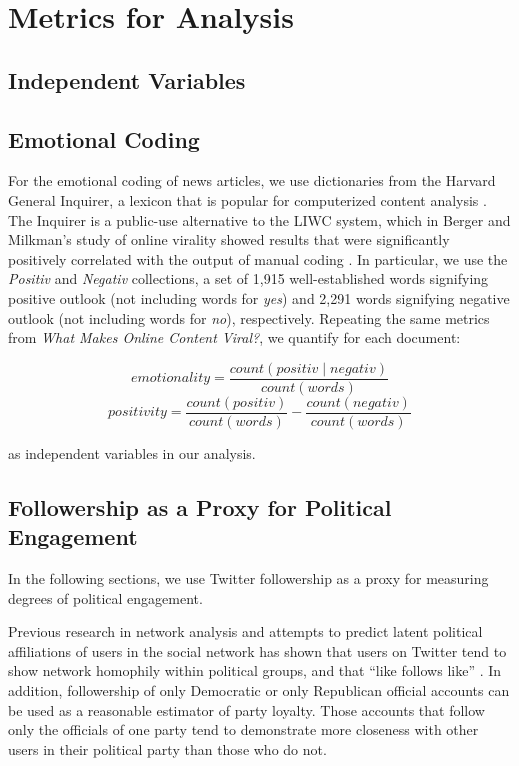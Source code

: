  \chapter{Metrics for Analysis}
\section{Independent Variables}


\section{Emotional Coding}
For the emotional coding of news articles, we use dictionaries from the Harvard General Inquirer, a lexicon that is popular for computerized content analysis \cite{ stone1963computer}. The Inquirer is a public-use alternative to the LIWC system, which in Berger and Milkman’s study of online virality showed results that were significantly positively correlated with the output of manual coding \cite{berger2012makes}. In particular, we use the \emph{Positiv} and \emph{Negativ} collections, a set of 1,915 well-established words signifying positive outlook (not including words for \emph{yes}) and 2,291 words signifying negative outlook (not including words for \emph{no}), respectively. Repeating the same metrics from \emph{What Makes Online Content Viral?}, we quantify for each document:

$$ emotionality = \frac{count(positiv \mid negativ)}{count(words)}$$
$$ positivity = \frac{count(positiv)}{count(words)} - \frac{count(negativ)}{count(words)}$$

as independent variables in our analysis.

 \section{Followership as a Proxy for Political Engagement}
In the following sections, we use Twitter followership as a proxy for measuring degrees of political engagement. 

Previous research in network analysis and attempts to predict latent political affiliations of users in the social network has shown that users on Twitter tend to show network homophily within political groups, and that ``like follows like'' \cite{colleoni2014echo}. In addition, followership of only Democratic or only Republican official accounts can be used as a reasonable estimator of party loyalty. Those accounts that follow only the officials of one party tend to demonstrate more closeness with other users in their political party than those who do not.
            
